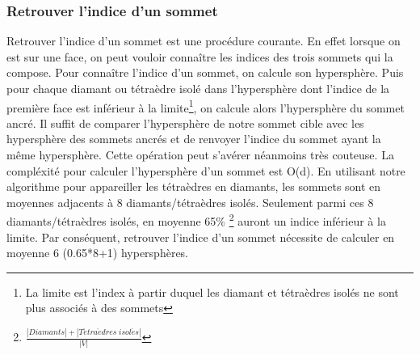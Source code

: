 \subsubsection{Retrouver l'indice d'un sommet}
\label{Retrouver l'indice d'un sommet}
\noindent
Retrouver l'indice d'un sommet est une procédure courante. En effet lorsque on est sur une face, on peut vouloir connaître les indices des trois sommets qui la compose. Pour connaître l'indice d'un sommet, on calcule son hypersphère. Puis pour chaque diamant ou tétraèdre isolé dans l'hypersphère dont l'indice de la première face est inférieur à la limite\footnote{La limite est l'index à partir duquel les diamant et tétraèdres isolés ne sont plus associés à des sommets}, on calcule alors l'hypersphère du sommet ancré. Il suffit de comparer l'hypersphère de notre sommet cible avec les hypersphère des sommets ancrés et de renvoyer l'indice du sommet ayant la même hypersphère. Cette opération peut s'avérer néanmoins très couteuse. La compléxité pour calculer l'hypersphère d'un sommet est O(d). En utilisant notre algorithme pour appareiller les tétraèdres en diamants, les sommets sont en moyennes adjacents à 8 diamants/tétraèdres isolés. Seulement parmi ces 8 diamants/tétraèdres isolés, en moyenne 65\% \footnote{$\frac{|Diamants|+|T\acute{e}tra\grave{e}dres\; isol\acute{e}s|}{|V|}$} auront un indice inférieur à la limite. Par conséquent, retrouver l'indice d'un sommet nécessite de calculer en moyenne 6 (0.65*8+1) hypersphères.

% 
% 


